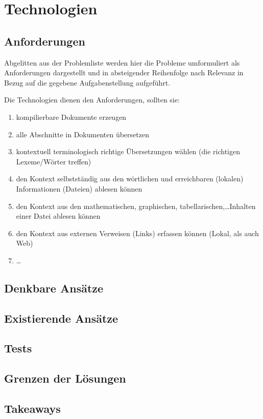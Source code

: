 \section{Technologien}
\subsection{Anforderungen}\label{technologies:demands}
Abgelitten aus der Problemliste werden hier die Probleme umformuliert als Anforderungen dargestellt und in absteigender Reihenfolge nach Relevanz in Bezug auf die gegebene Aufgabenstellung aufgeführt.

Die Technologien dienen den Anforderungen, sollten sie:\ 
\begin{enumerate}
    \item kompilierbare Dokumente erzeugen
    \item alle Abschnitte in Dokumenten übersetzen
    \item kontextuell terminologisch richtige Übersetzungen wählen (die richtigen Lexeme/Wörter treffen)%
    \item den Kontext selbstständig aus den wörtlichen und erreichbaren (lokalen) Informationen (Dateien) ablesen können
    \item den Kontext aus den mathematischen, graphischen, tabellarischen,\ldots Inhalten einer Datei ablesen können
    \item den Kontext aus externen Verweisen (Links) erfassen können (Lokal, als auch Web)
    \item \ldots
\end{enumerate}
\subsection{Denkbare Ansätze}%
\subsection{Existierende Ansätze}%
\subsection{Tests}%
\subsection{Grenzen der Lösungen}%
\subsection{Takeaways}%